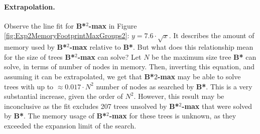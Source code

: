 \paragraph{Extrapolation.}
Observe the line fit for \textbf{B*}$^2$\textbf{-max} in Figure \ref{fig:Exp2MemoryFootprintMaxGroups2}: $y=7.6\cdot\sqrt{x}$. It describes the amount of memory used by \textbf{B*}$^2$\textbf{-max} relative to \textbf{B*}. But what does this relationship mean for the size of trees \textbf{B*}$^2$\textbf{-max} can solve? Let $N$ be the maximum size tree \textbf{B*} can solve, in terms of number of nodes in memory. Then, inverting this equation, and assuming it can be extrapolated, we get that \textbf{B*}$2$\textbf{-max} may be able to solve trees with up to $\approx0.017\cdot N^2$ number of nodes as searched by \textbf{B*}. This is a very substantial increase, given the order of $N^2$. However, this result may be inconclusive as the fit excludes 207 trees unsolved by \textbf{B*}$^2$\textbf{-max} that were solved by \textbf{B*}. The memory usage of \textbf{B*}$^2$\textbf{-max} for these trees is unknown, as they exceeded the expansion limit of the search.
%
%
%
\FloatBarrier
